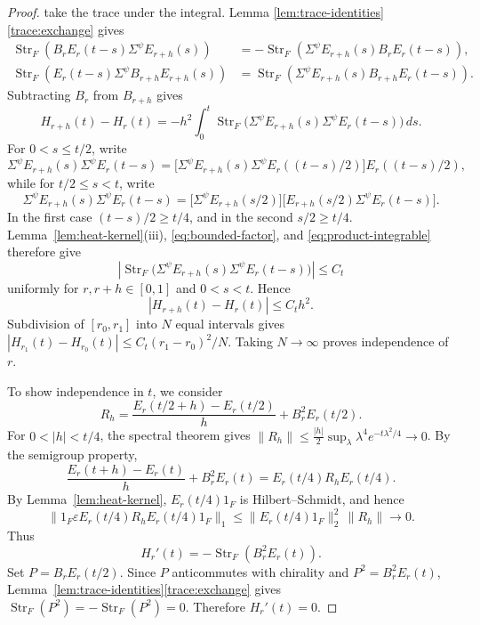 \documentclass[12pt,reqno]{amsart}
\numberwithin{equation}{section}
\theoremstyle{definition}
\newcommand{\Str}{\operatorname{Str}}
\begin{document}
\begin{proof}
take the trace under the integral.  Lemma
\ref{lem:trace-identities}\ref{trace:exchange} gives
\[
\begin{aligned}
 \Str_F(B_rE_r(t-s)\Sigma^\psi E_{r+h}(s))
 &=-\Str_F(\Sigma^\psi E_{r+h}(s)B_rE_r(t-s)),\\
 \Str_F(E_r(t-s)\Sigma^\psi B_{r+h}E_{r+h}(s))
 &=\Str_F(\Sigma^\psi E_{r+h}(s)B_{r+h}E_r(t-s)).
\end{aligned}
\]
Subtracting $B_r$ from $B_{r+h}$ gives
\begin{equation}\label{eq:heat-quadratic-difference}
 H_{r+h}(t)-H_r(t)
 =-h^2\int_0^t\Str_F\bigl(
 \Sigma^\psi E_{r+h}(s)\Sigma^\psi E_r(t-s)\bigr)\,ds.
\end{equation}
For $0<s\leq t/2$, write
\[
 \Sigma^\psi E_{r+h}(s)\Sigma^\psi E_r(t-s)
 =
 \bigl[\Sigma^\psi E_{r+h}(s)\Sigma^\psi
 E_r((t-s)/2)\bigr]E_r((t-s)/2),
\]
while for $t/2\leq s<t$, write
\[
 \Sigma^\psi E_{r+h}(s)\Sigma^\psi E_r(t-s)
 =
 \bigl[\Sigma^\psi E_{r+h}(s/2)\bigr]
 \bigl[E_{r+h}(s/2)\Sigma^\psi E_r(t-s)\bigr].
\]
In the first case $(t-s)/2\geq t/4$, and in the second
$s/2\geq t/4$.  Lemma~\ref{lem:heat-kernel}\textup{(iii)},
\eqref{eq:bounded-factor}, and \eqref{eq:product-integrable} therefore give
\[
 \left|
 \Str_F\bigl(
 \Sigma^\psi E_{r+h}(s)\Sigma^\psi E_r(t-s)
 \bigr)
 \right|
 \leq C_t
\]
uniformly for $r,r+h\in[0,1]$ and $0<s<t$.  Hence
\[
 |H_{r+h}(t)-H_r(t)|\leq C_t h^2.
\]
Subdivision of
$[r_0,r_1]$ into $N$ equal intervals gives
$|H_{r_1}(t)-H_{r_0}(t)|\leq C_t(r_1-r_0)^2/N$. Taking $N\to\infty$ proves
independence of $r$.

To show independence in $t$, we consider
\[
 R_h=\frac{E_r(t/2+h)-E_r(t/2)}h+B_r^2E_r(t/2).
\]
For $0<|h|<t/4$, the spectral theorem gives
$\|R_h\|\leq\frac{|h|}{2}\sup_\lambda\lambda^4e^{-t\lambda^2/4}\to0$.
By the semigroup property,
\[
 \frac{E_r(t+h)-E_r(t)}h+B_r^2E_r(t)
 =E_r(t/4)R_hE_r(t/4).
\]
By Lemma~\ref{lem:heat-kernel}, $E_r(t/4)1_F$ is
Hilbert--Schmidt, and hence
\[
 \bigl\|
 1_F\varepsilon E_r(t/4)R_hE_r(t/4)1_F
 \bigr\|_1
 \leq
 \|E_r(t/4)1_F\|_2^2\,\|R_h\|
 \longrightarrow0.
\]
Thus
\[
 H_r'(t)=-\Str_F(B_r^2E_r(t)).
\]
Set $P=B_rE_r(t/2)$.  Since $P$ anticommutes with chirality and
$P^2=B_r^2E_r(t)$, Lemma~\ref{lem:trace-identities}\ref{trace:exchange}
gives $\Str_F(P^2)=-\Str_F(P^2)=0$.  Therefore $H_r'(t)=0$.
\end{proof}



\end{document}

